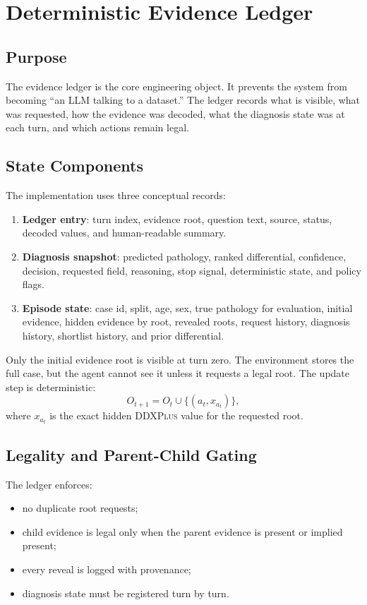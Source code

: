 \documentclass[11pt]{article}
\newcommand{\ddx}{\textsc{DDXPlus}}
\begin{document}
\section{Deterministic Evidence Ledger}

\subsection{Purpose}

The evidence ledger is the core engineering object. It prevents the system from becoming ``an LLM talking to a dataset.'' The ledger records what is visible, what was requested, how the evidence was decoded, what the diagnosis state was at each turn, and which actions remain legal.

\subsection{State Components}

The implementation uses three conceptual records:
\begin{enumerate}[leftmargin=*]
    \item \textbf{Ledger entry}: turn index, evidence root, question text, source, status, decoded values, and human-readable summary.
    \item \textbf{Diagnosis snapshot}: predicted pathology, ranked differential, confidence, decision, requested field, reasoning, stop signal, deterministic state, and policy flags.
    \item \textbf{Episode state}: case id, split, age, sex, true pathology for evaluation, initial evidence, hidden evidence by root, revealed roots, request history, diagnosis history, shortlist history, and prior differential.
\end{enumerate}

Only the initial evidence root is visible at turn zero. The environment stores the full case, but the agent cannot see it unless it requests a legal root. The update step is deterministic:
\[
O_{t+1} = O_t \cup \{(a_t, x_{a_t})\},
\]
where $x_{a_t}$ is the exact hidden \ddx{} value for the requested root.

\subsection{Legality and Parent-Child Gating}

The ledger enforces:
\begin{itemize}[leftmargin=*]
    \item no duplicate root requests;
    \item child evidence is legal only when the parent evidence is present or implied present;
    \item every reveal is logged with provenance;
    \item diagnosis state must be registered turn by turn.
\end{itemize}
\end{document}
